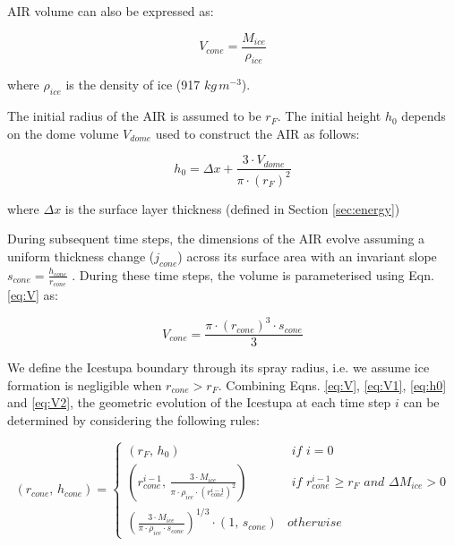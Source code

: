 \documentclass[utf8]{frontiersSCNS}
\begin{document}
AIR volume can also be expressed as:

\begin{equation} V_{cone} =\frac{M_{ice}} {\rho_{ice}} \label{eq:V1} \end{equation}

where $\rho_{ice}$ is the density of ice (917 $kg\, m^{-3}$). 

The initial radius of the AIR is assumed to be $r_F$. The initial height $h_0$ depends on the dome volume
$V_{dome}$ used to construct the AIR as follows:

\begin{equation}
	h_{0} =  \Delta x + \frac{3 \cdot V_{dome}}{\pi \cdot (r_F)^2 }
	\label{eq:h0}
\end{equation}

where $\Delta x$ is the surface layer thickness (defined in Section \ref{sec:energy})

During subsequent time steps, the dimensions of the AIR evolve assuming a uniform thickness change ($j_{cone}$)
across its surface area with an invariant slope $s_{cone} = \frac{h_{cone}}{r_{cone}}$ .  During these time
steps, the volume is parameterised using Eqn. \ref{eq:V} as:

\begin{equation} V_{cone} = \frac{\pi \cdot {(r_{cone})}^3
		\cdot s_{cone}}{3} \label{eq:V2} \end{equation}

We define the Icestupa boundary through its spray radius, i.e. we assume ice formation is negligible when $r_{cone} >
	r_{F}$. Combining Eqns. \ref{eq:V},  \ref{eq:V1}, \ref{eq:h0} and \ref{eq:V2}, the geometric evolution of the
Icestupa at each time step $i$ can be determined by considering the following rules:

\begin{equation} (r_{cone},\, h_{cone}) = \left\{ \begin{array}{ll} (r_F ,\, h_0)                                                                          & \textit{ if } i=0 \\
		(r_{cone}^{i-1},\, \frac{3 \cdot M_{ice}}{\pi \cdot \rho_{ice} \cdot {(r_{cone}^{i-1})}^2}) & \textit{ if }
		r_{cone}^{i-1} \geq r_{F} \textit{ and } \Delta M_{ice} > 0                                                     \\ (\frac{3 \cdot M_{ice}}{\pi \cdot \rho_{ice} \cdot s_{cone}})^{1/3} \cdot (1,\,  s_{cone}) &
		otherwise\end{array} \right.  \label{eq:A2} \end{equation}
\end{document}
